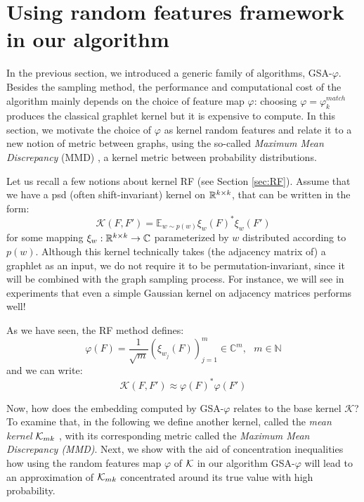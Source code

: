 \section{Using random features framework in our algorithm}

In the previous section, we introduced a generic family of algorithms, GSA-$\varphi$. Besides the sampling method, the performance and computational cost of the algorithm mainly depends on the choice of feature map $\varphi$: choosing $\varphi = \varphi^{match}_k$ produces the classical graphlet kernel but it is expensive to compute. In this section, we motivate the choice of $\varphi$ as kernel random features  and relate it to a new notion of metric between graphs, using the so-called \emph{Maximum Mean Discrepancy} (MMD) \citep{gretton}, a kernel metric between probability distributions.

Let us recall a few notions about kernel RF (see Section \ref{sec:RF}). Assume that we have a psd (often shift-invariant) kernel on $\mathbb{R}^{k \times k}$, that can be written in the form:
\begin{equation}
\label{eq:random_features_3}
\mathcal{K}(F,F')= \mathbb{E}_{w \sim p(w)} \xi_w(F)^* \xi_w(F')
\end{equation}
for some mapping $\xi_w : \mathbb{R}^{k \times k} \to \mathbb{C}$ parameterized by $w$ distributed according to $p(w)$. Although this kernel technically takes (the adjacency matrix of) a graphlet as an input, we do not require it to be permutation-invariant, since it will be combined with the graph sampling process. For instance, we will see in experiments that even a simple Gaussian kernel on adjacency matrices performs well!

As we have seen, the RF method defines:
\begin{equation}\label{eq:RF}
\varphi(F) = \frac{1}{\sqrt{m}} ( \xi_{w_j}(F) )_{j=1}^m \in \mathbb{C}^m,~~~ m\in \mathbb{N}
\end{equation}
and we can write:
\[
\mathcal{K}(F,F')\approx \varphi(F)^*\varphi(F')
\]

Now, how does the embedding computed by GSA-$\varphi$ relates to the base kernel $\mathcal{K}$? To examine that, in the following we define another kernel, called the \emph{mean kernel} $\mathcal{K}_{mk}$ \citep{gretton}, with its corresponding metric called the \emph{Maximum Mean Discrepancy (MMD)}. Next, we show with the aid of concentration inequalities how using the random features map $\varphi$ of $\mathcal{K}$ in our algorithm GSA-$\varphi$ will lead to an approximation of $\mathcal{K}_{mk}$ concentrated around its true value with high probability.

